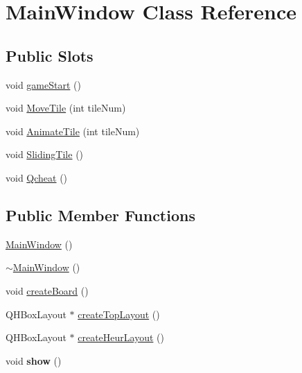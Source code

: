 \hypertarget{classMainWindow}{\section{\-Main\-Window \-Class \-Reference}
\label{classMainWindow}
}
\subsection*{\-Public \-Slots}
\begin{DoxyCompactItemize}
\item 
void \hyperlink{classMainWindow_a02127f11adbe27c930b500fe442ad254}{game\-Start} ()
\item 
void \hyperlink{classMainWindow_a2c753e1b4739a6ba23b9f4ab3c205c12}{\-Move\-Tile} (int tile\-Num)
\item 
void \hyperlink{classMainWindow_a357903d00487357b6f2c8f1db9b82efa}{\-Animate\-Tile} (int tile\-Num)
\item 
void \hyperlink{classMainWindow_a2872977f47387d15629d393d90027ede}{\-Sliding\-Tile} ()
\item 
void \hyperlink{classMainWindow_aef1fbfe37d2d7265a33a0c894f5dc99b}{\-Qcheat} ()
\end{DoxyCompactItemize}
\subsection*{\-Public \-Member \-Functions}
\begin{DoxyCompactItemize}
\item 
\hyperlink{classMainWindow_a34c4b4207b46d11a4100c9b19f0e81bb}{\-Main\-Window} ()
\item 
\hyperlink{classMainWindow_ae98d00a93bc118200eeef9f9bba1dba7}{$\sim$\-Main\-Window} ()
\item 
void \hyperlink{classMainWindow_ac4a19e31822e02d19b029d798a53a7fd}{create\-Board} ()
\item 
\-Q\-H\-Box\-Layout $\ast$ \hyperlink{classMainWindow_aeea638e608801de4daa4616421d0b81f}{create\-Top\-Layout} ()
\item 
\-Q\-H\-Box\-Layout $\ast$ \hyperlink{classMainWindow_a77f1f9b13a1b095055d347392e3a4502}{create\-Heur\-Layout} ()
\item 
\hypertarget{classMainWindow_ae3d7a4598609a86e8bd317c0d85c4495}{void {\bfseries show} ()}\label{classMainWindow_ae3d7a4598609a86e8bd317c0d85c4495}

\end{DoxyCompactItemize}


